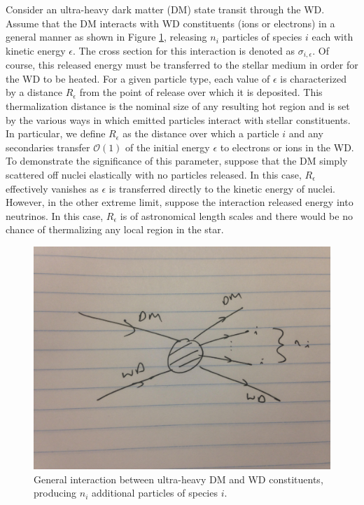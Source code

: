 \documentclass[twocolumn,showpacs,preprintnumbers,amsmath,amssymb,prd]{revtex4}
\newcommand{\OO}{\mathcal{O}}
\begin{document}
Consider an ultra-heavy dark matter (DM) state transit through the WD. Assume that the DM interacts with WD constituents (ions or electrons) in a general manner as shown in Figure \ref{fig:feynmandiag}, releasing $n_i$ particles of species $i$ each with kinetic energy $\epsilon$. The cross section for this interaction is denoted as $\sigma_{i,\epsilon}$. Of course, this released energy must be transferred to the stellar medium in order for the WD to be heated. For a given particle type, each value of $\epsilon$ is characterized by a distance $R_\epsilon$ from the point of release over which it is deposited. This thermalization distance is the nominal size of any resulting hot region and is set by the various ways in which emitted particles interact with stellar constituents. In particular, we define $R_\epsilon$ as the distance over which a particle $i$ and any secondaries transfer $\OO(1)$ of the initial energy $\epsilon$ to electrons or ions in the WD. To demonstrate the significance of this parameter, suppose that the DM simply scattered off nuclei elastically with no particles released. In this case, $R_\epsilon$ effectively vanishes as $\epsilon$ is transferred directly to the kinetic energy of nuclei. However, in the other extreme limit, suppose the interaction released energy into neutrinos. In this case, $R_\epsilon$ is of astronomical length scales and there would be no chance of thermalizing any local region in the star.

\begin{figure}
\label{fig:feynmandiag}
\includegraphics[scale=.05]{feynmandiag}
\caption{General interaction between ultra-heavy DM and WD constituents, producing $n_i$ additional particles of species $i$.}
\end{figure}
\end{document}
